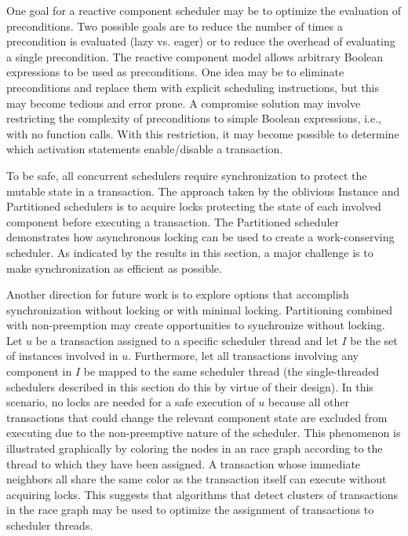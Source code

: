 One goal for a reactive component scheduler may be to optimize the evaluation of preconditions.
Two possible goals are to reduce the number of times a precondition is evaluated (lazy vs. eager) or to reduce the overhead of evaluating a single precondition.
The reactive component model allows arbitrary Boolean expressions to be used as preconditions.
One idea may be to eliminate preconditions and replace them with explicit scheduling instructions, but this may become tedious and error prone.
A compromise solution may involve restricting the complexity of preconditions to simple Boolean expressions, i.e., with no function calls.
With this restriction, it may become possible to determine which activation statements enable/disable a transaction.

To be safe, all concurrent schedulers require synchronization to protect the mutable state in a transaction.
The approach taken by the oblivious Instance and Partitioned schedulers is to acquire locks protecting the state of each involved component before executing a transaction.
The Partitioned scheduler demonstrates how asynchronous locking can be used to create a work-conserving scheduler.
As indicated by the results in this section, a major challenge is to make synchronization as efficient as possible.

Another direction for future work is to explore options that accomplish synchronization without locking or with minimal locking.
Partitioning combined with non-preemption may create opportunities to synchronize without locking.
Let $u$ be a transaction assigned to a specific scheduler thread and let $I$ be the set of instances involved in $u$.
Furthermore, let all transactions involving any component in $I$ be mapped to the same scheduler thread (the single-threaded schedulers described in this section do this by virtue of their design).
In this scenario, no locks are needed for a safe execution of $u$ because all other transactions that could change the relevant component state are excluded from executing due to the non-preemptive nature of the scheduler.
This phenomenon is illustrated graphically by coloring the nodes in an race graph according to the thread to which they have been assigned.
A transaction whose immediate neighbors all share the same color as the transaction itself can execute without acquiring locks.
This suggests that algorithms that detect clusters of transactions in the race graph may be used to optimize the assignment of transactions to scheduler threads.

